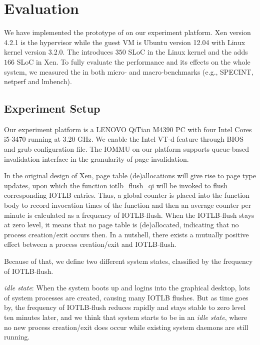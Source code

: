 \section{Evaluation} \label{sec:eva}
We have implemented the prototype of \name on our experiment platform.
Xen version 4.2.1 is the hypervisor while the guest VM is Ubuntu version 12.04 with Linux kernel version 3.2.0. 
The \cache introduces $350$ SLoC in the Linux kernel and the \module adds $166$ SLoC in Xen.
To fully evaluate the performance and its effects on the whole system, we measured the \name in both micro- and macro-benchmarks (e.g., SPECINT, netperf and lmbench).

\subsection{Experiment Setup}
Our experiment platform is a LENOVO QiTian M4390 PC with four Intel Cores i5-3470 running at 3.20 GHz. 
We enable the Intel VT-d feature through BIOS and grub configuration file. The IOMMU on our platform supports queue-based invalidation interface in the granularity of page invalidation. 

In the original design of Xen, page table (de)allocations will give rise to page type updates, upon which the function iotlb\_flush\_qi will be invoked to flush corresponding IOTLB entries. Thus, a global counter is placed into the function body to record invocation times of the function and then an average counter per minute is calculated as a frequency of IOTLB-flush. When the IOTLB-flush stays at zero level, it means that no page table is (de)allocated, indicating that no process creation/exit occurs then. In a nutshell, there exists a mutually positive effect between a process creation/exit and IOTLB-flush.

Because of that, we define two different system states, classified by the frequency of IOTLB-flush.

\emph{idle state}: When the system boots up and logins into the graphical desktop, lots of system processes are created, causing many IOTLB flushes. But as time goes by, the frequency of IOTLB-flush reduces rapidly and stays stable to zero level ten minutes later, and we think that system starts to be in an \emph{idle state}, where no new process creation/exit does occur while existing system daemons are still running.


